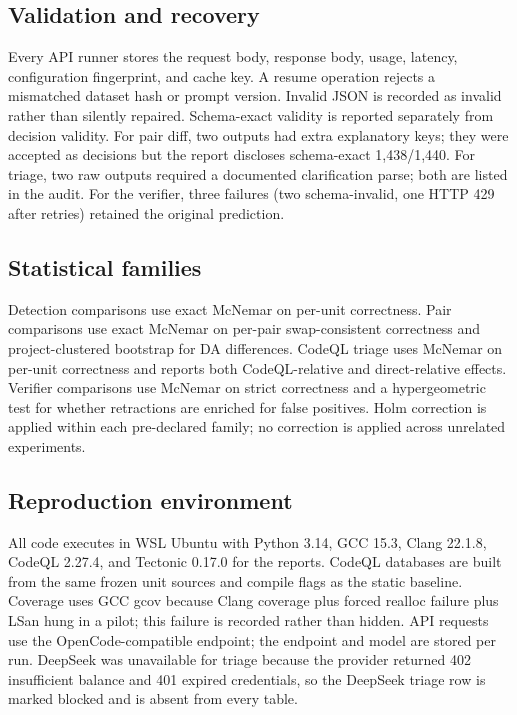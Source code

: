 \documentclass[conference]{IEEEtran}
\begin{document}
\subsection{Validation and recovery}

Every API runner stores the request body, response body, usage, latency, configuration fingerprint, and cache key. A resume operation rejects a mismatched dataset hash or prompt version. Invalid JSON is recorded as invalid rather than silently repaired. Schema-exact validity is reported separately from decision validity. For pair diff, two outputs had extra explanatory keys; they were accepted as decisions but the report discloses schema-exact 1,438/1,440. For triage, two raw outputs required a documented clarification parse; both are listed in the audit. For the verifier, three failures (two schema-invalid, one HTTP 429 after retries) retained the original prediction.

\subsection{Statistical families}

Detection comparisons use exact McNemar on per-unit correctness. Pair comparisons use exact McNemar on per-pair swap-consistent correctness and project-clustered bootstrap for DA differences. CodeQL triage uses McNemar on per-unit correctness and reports both CodeQL-relative and direct-relative effects. Verifier comparisons use McNemar on strict correctness and a hypergeometric test for whether retractions are enriched for false positives. Holm correction is applied within each pre-declared family; no correction is applied across unrelated experiments.

\subsection{Reproduction environment}

All code executes in WSL Ubuntu with Python 3.14, GCC 15.3, Clang 22.1.8, CodeQL 2.27.4, and Tectonic 0.17.0 for the reports. CodeQL databases are built from the same frozen unit sources and compile flags as the static baseline. Coverage uses GCC gcov because Clang coverage plus forced realloc failure plus LSan hung in a pilot; this failure is recorded rather than hidden. API requests use the OpenCode-compatible endpoint; the endpoint and model are stored per run. DeepSeek was unavailable for triage because the provider returned 402 insufficient balance and 401 expired credentials, so the DeepSeek triage row is marked blocked and is absent from every table.
\end{document}
